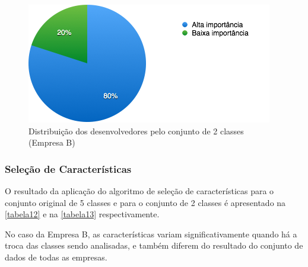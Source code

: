 \begin{figure}[h]
	\centering
	\includegraphics[scale=0.8]{figs/empresa_b/imagem-classe-alternativa.png}
	\caption{\label{fig_12}Distribuição dos desenvolvedores pelo conjunto de 2 classes (Empresa B)}
\end{figure}

\subsubsection{Seleção de Características}
O resultado da aplicação do algoritmo de seleção de características para o conjunto original de 5 classes e para o conjunto de 2 classes é apresentado na \autoref{tabela12} e na \autoref{tabela13} respectivamente.

No caso da Empresa B, as características variam significativamente quando há a troca das classes sendo analisadas, e também diferem do resultado do conjunto de dados de todas as empresas.

